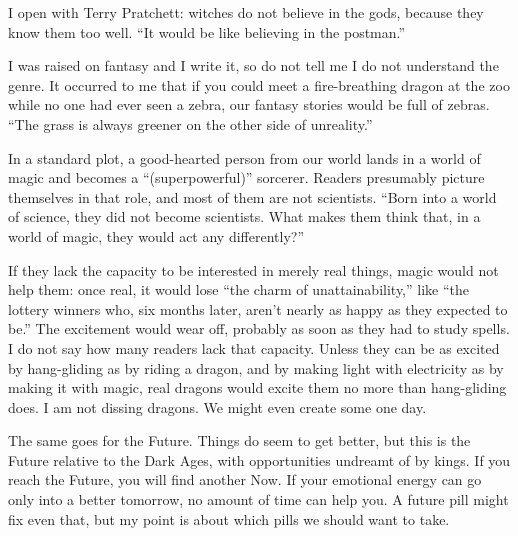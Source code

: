 
I open with Terry Pratchett: witches do not believe in the gods, because they know them too well. ``It would be like believing in the postman.''

I was raised on fantasy and I write it, so do not tell me I do not understand the genre. It occurred to me that if you could meet a fire-breathing dragon at the zoo while no one had ever seen a zebra, our fantasy stories would be full of zebras. ``The grass is always greener on the other side of unreality.''

In a standard plot, a good-hearted person from our world lands in a world of magic and becomes a ``(superpowerful)'' sorcerer. Readers presumably picture themselves in that role, and most of them are not scientists. ``Born into a world of science, they did not become scientists. What makes them think that, in a world of magic, they would act any differently?''

If they lack the capacity to be interested in merely real things, magic would not help them: once real, it would lose ``the charm of unattainability,'' like ``the lottery winners who, six months later, aren't nearly as happy as they expected to be.'' The excitement would wear off, probably as soon as they had to study spells.  I do not say how many readers lack that capacity. Unless they can be as excited by hang-gliding as by riding a dragon, and by making light with electricity as by making it with magic, real dragons would excite them no more than hang-gliding does. I am not dissing dragons. We might even create some one day.

The same goes for the Future. Things do seem to get better, but this is the Future relative to the Dark Ages, with opportunities undreamt of by kings. If you reach the Future, you will find another Now. If your emotional energy can go only into a better tomorrow, no amount of time can help you. A future pill might fix even that, but my point is about which pills we should want to take.

